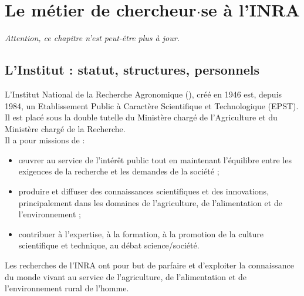 \chapter{Le m\'etier de chercheur$\cdot$se \`a l'INRA}
\emph{Attention, ce chapitre n'est peut-\^etre plus \`a jour.}

\section{L'Institut : statut, structures, personnels}

L'Institut National de la Recherche Agronomique (), cr\'e\'e en 1946 est, depuis 1984, un Etablissement Public \`a Caract\`ere Scientifique et Technologique (EPST). Il est plac\'e sous la double tutelle du Minist\`ere charg\'e de l'Agriculture et du Minist\`ere charg\'e de la Recherche.\\
Il a pour missions de :
\begin{itemize}
\item \oe uvrer au service de l'int\'er\^et public tout en maintenant l'\'equilibre entre les exigences de la recherche et les demandes de la soci\'et\'e ;
\item produire et diffuser des connaissances scientifiques et des innovations, principalement dans les domaines de l'agriculture, de l'alimentation et de l'environnement ;
\item contribuer \`a l'expertise, \`a la formation, \`a la promotion de la culture scientifique et technique, au d\'ebat science/soci\'et\'e.
\end{itemize}

\medskip

Les recherches de l'INRA ont pour but de parfaire et d'exploiter la connaissance du monde vivant au service de l'agriculture, de l'alimentation et de l'environnement rural de l'homme.\\

